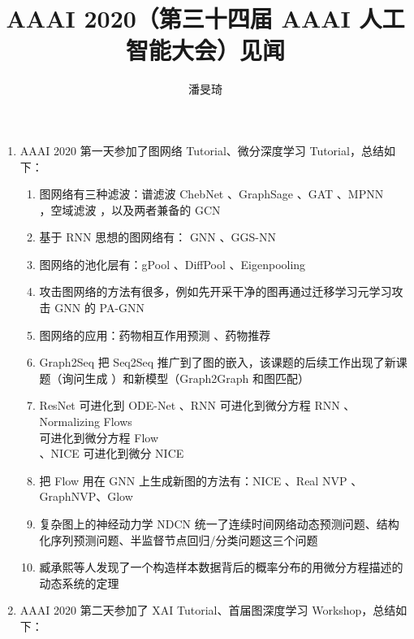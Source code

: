 \documentclass[11pt]{article}
\title{AAAI 2020（第三十四届 AAAI 人工智能大会）见闻}
\author{潘旻琦}
\date{}
\begin{document}
\maketitle

\begin{enumerate}
\item AAAI 2020 第一天参加了图网络 Tutorial、微分深度学习 Tutorial，总结如下：
\begin{enumerate}
\item 图网络有三种滤波：谱滤波 ChebNet \cite{DBLP:conf/nips/DefferrardBV16}、GraphSage \cite{NIPS2017_6703}、GAT \cite{velivckovic2017graph}、MPNN\\\cite{DBLP:journals/corr/GilmerSRVD17}，空域滤波 ，以及两者兼备的 GCN\\\cite{DBLP:journals/corr/KipfW16}
\item 基于 RNN 思想的图网络有： GNN \cite{scarselli2008graph}、GGS-NN\\\cite{li2015gated}
\item 图网络的池化层有：gPool \cite{DBLP:journals/corr/abs-1905-05178}、DiffPool \cite{NIPS2018_7729}、Eigenpooling \cite{ea10620ddd4f49d98891463c432789ff}
\item 攻击图网络的方法有很多，例如先开采干净的图再通过迁移学习元学习攻击 GNN 的 PA-GNN \cite{tang2019robust}
\item 图网络的应用：药物相互作用预测 \cite{ma2019genn}、药物推荐\\\cite{shang2019pre}
\item Graph2Seq \cite{xu2018graph2seq} 把 Seq2Seq 推广到了图的嵌入，该课题的后续工作出现了新课题（询问生成 \cite{chen2019reinforcement}）和新模型（Graph2Graph \cite{mohammadshahi2019graph}和图匹配\cite{li2019graph}）
\item ResNet \cite{10.1007/978-3-319-46493-0_38} 可进化到 ODE-Net \cite{DBLP:journals/corr/abs-1806-07366}、RNN 可进化到微分方程 RNN \cite{410363}、Normalizing Flows\\ \cite{rezende2015variational} 可进化到微分方程 Flow\\\cite{DBLP:journals/corr/abs-1806-07366}、NICE \cite{dinh2014nice} 可进化到微分 NICE\\\cite{DBLP:journals/corr/DinhSB16}
\item 把 Flow 用在 GNN 上生成新图的方法有：NICE \cite{dinh2014nice}、Real NVP \cite{DBLP:journals/corr/DinhSB16}、GraphNVP\cite{madhawa2019graphnvp}、Glow\\\cite{NIPS2018_8224}
\item 复杂图上的神经动力学 NDCN \cite{zang2019neural} 统一了连续时间网络动态预测问题、结构化序列预测问题、半监督节点回归/分类问题这三个问题
\item 臧承熙等人发现了一个构造样本数据背后的概率分布的用微分方程描述的动态系统的定理 \cite{10.1145/3292500.3330842}
\end{enumerate}
\item AAAI 2020 第二天参加了 XAI Tutorial、首届图深度学习 Workshop，总结如下：
\begin{enumerate}


\end{enumerate}
\end{enumerate}
\end{document}
